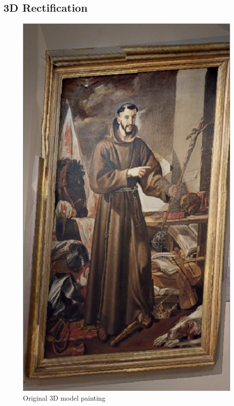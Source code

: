 \subsection{3D Rectification}


\begin{figure}[h]
      \includegraphics[width=\linewidth]{pictures/painting_detection/3d_rectification_original.PNG}
      \caption*{Original 3D model painting}\label{fig:rectification_original}
    \endminipage\hfill

\end{figure}

